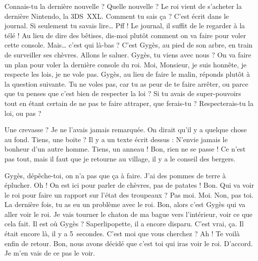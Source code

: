 \documentclass[12pt, a5paper, french]{memoir}
\begin{document}
\newpage
\pagestyle{myps}
\begin{linenumbers}


\StageDir{\Gyges, \Bonnie, \Clyde}
\begin{drama}
\Bonniespeaks Connais-tu la dernière nouvelle ?
\Clydespeaks Quelle nouvelle ?
\Bonniespeaks Le roi vient de s’acheter la dernière Nintendo, la 3DS~XXL.
\Clydespeaks Comment tu sais ça ?
\Bonniespeaks C’est écrit dans le journal. Si seulement tu savais lire\dots
\Clydespeaks Pff ! Le journal, il suffit de le regarder à la télé !
\Bonniespeaks Au lieu de dire des bêtises, dis-moi plutôt comment on va faire pour voler cette console.
\Clydespeaks Mais\dots{} c’est qui là-bas ?
\Bonniespeaks C’est Gygès, au pied de son arbre, en train de surveiller ses chèvres.
\Clydespeaks Allons le saluer.  Gygès, tu viens avec nous ? On va faire un plan pour voler la dernière console du roi.
\Gygesspeaks Moi, Monsieur, je suis honnête, je respecte les lois, je ne vole pas.
\newpage
\Bonniespeaks Gygès, au lieu de faire le malin, réponds plutôt à la question suivante. Tu ne voles pas, car tu as peur de te faire arrêter, ou parce que tu penses que c’est bien de respecter la loi ? Si tu avais de super-pouvoirs tout en étant certain de ne pas te faire attraper, que ferais-tu ? Respecterais-tu la loi, ou pas ?

\scene[L’anneau]
\StageDir{\Gyges}
\Gygesspeaks Une crevasse ? Je ne l’avais jamais remarquée. On dirait qu’il y a quelque chose au fond. Tiens, une boite ? Il y a un texte écrit dessus : \og N’envie jamais le bonheur d’un autre homme. \fg{}  Tiens, un anneau !  Bon, rien ne se passe ! Ce n’est pas tout, mais il faut que je retourne au village, il y a le conseil des bergers.
\newpage

\scene[Le messager]
\StageDir{\Gyges, \Leonardo, \Donatello, \Michelangelo, \Raffaello, \Tiziano}
\Leonardospeaks Gygès, dépêche-toi, on n’a pas que ça à faire. J’ai des pommes de terre à éplucher.
\Donatellospeaks Oh ! On est ici pour parler de chèvres, pas de patates !
\Michelangelospeaks Bon. Qui va voir le roi pour faire un rapport sur l'état des troupeaux ?
\Raffaellospeaks Pas moi.
\Tizianospeaks Moi.
\Donatellospeaks Non, pas toi. La dernière fois, tu as eu un problème avec le roi.
\Leonardospeaks Bon, alors c’est Gygès qui va aller voir le roi.
\Gygesspeaks {} Je vais tourner le chaton de ma bague vers l’intérieur, voir ce que cela fait.
\Leonardospeaks Il est où Gygès ? Saperlipopette, il a encore disparu.
\Raffaellospeaks C’est vrai, ça. Il était encore là, il y a 5~secondes.
\newpage
\Gygesspeaks {} C’est moi que vous cherchez ?
\Tizianospeaks Ah ! Te voilà enfin de retour. Bon, nous avons décidé que c’est toi qui iras voir le roi.
\Gygesspeaks D’accord. Je m’en vais de ce pas le voir.


\end{drama}
\end{linenumbers}
\end{document}
